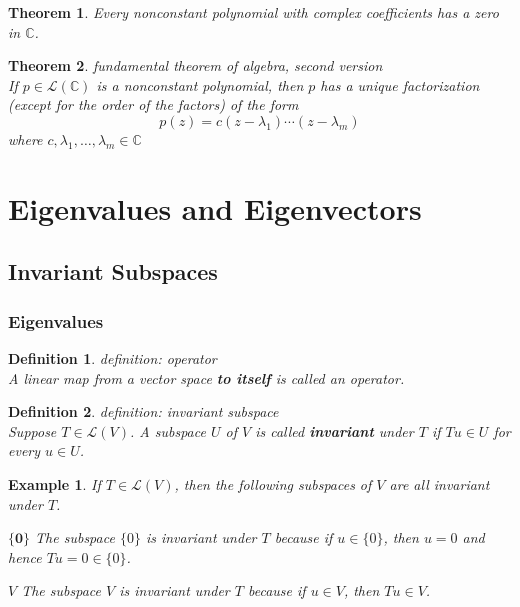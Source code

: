 \documentclass{article}
\newtheorem{theorem}{Theorem}[subsection]
\newtheorem{example}{Example}[subsection]
\newtheorem{definition}{Definition}[subsection]
\newcommand{\CC}{\mathbb{C}}
\begin{document}
\begin{CJK}{UTF8}{gkai}
\begin{theorem}
    Every nonconstant polynomial with complex coefficients has a zero in $\CC$.
\end{theorem}

\begin{theorem}
    fundamental theorem of algebra, second version\\

    If $p \in \mathcal{L}(\CC)$ is a nonconstant polynomial, then $p$ has a unique factorization (except for the order of the factors) of the form
    \[p(z) = c(z - \lambda_1)\cdots(z- \lambda_m)\]
    where $c, \lambda_1,\ldots, \lambda_m \in \CC$
\end{theorem}

\section{Eigenvalues and Eigenvectors}

\subsection{Invariant Subspaces}
\subsubsection{Eigenvalues}

\begin{definition}
    definition: operator\\

    A linear map from a vector space \textbf{to itself} is called an operator.
\end{definition}

\begin{definition}
    definition: invariant subspace\\

    Suppose $T \in \mathcal{L}(V)$. A subspace $U$ of $V$ is called \textbf{invariant} under $T$ if $Tu \in U$ for every $u \in U$.
\end{definition}

\begin{example}
    If $T \in \mathcal{L}(V)$, then the following subspaces of $V$ are all invariant under $T$.

    
    $\textbf{\{0\}}$ The subspace $\{0\}$ is invariant under $T$ because if $u \in \{0\}$, then $u = 0$ and hence $Tu = 0 \in \{0\}$.

    $V$ The subspace $V$ is invariant under $T$ because if $u \in V$, then $Tu \in V$.


\end{example}
\end{CJK}
\end{document}
